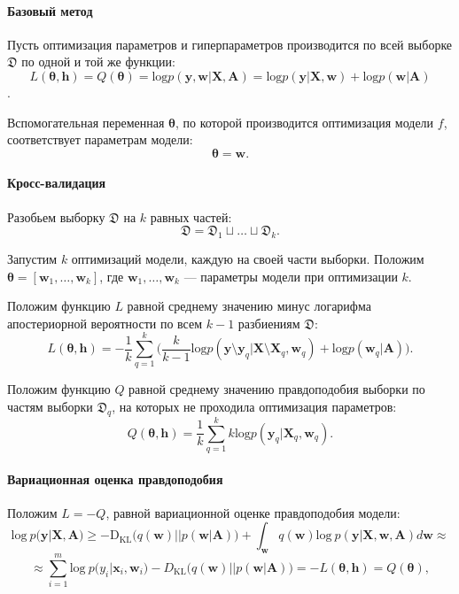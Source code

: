 \documentclass[12pt]{article}
\begin{document}
\paragraph{Базовый метод}
Пусть оптимизация параметров и гиперпараметров производится по всей выборке $\mathfrak{D}$ по одной и той же функции:
$$L(\boldsymbol{\theta}, \mathbf{h}) = Q(\boldsymbol{\theta}) = \text{log}p(\mathbf{y}, \mathbf{w} | \mathbf{X}, \mathbf{A}) = \text{log} p(\mathbf{y}|\mathbf{X}, \mathbf{w})+\text{log}p(\mathbf{w}|\mathbf{A})$$.

Вспомогательная переменная $\boldsymbol{\theta}$, по которой производится оптимизация модели $f$,  соответствует параметрам модели: 
\[
\boldsymbol{\theta} = \mathbf{w}.
\]

\paragraph{Кросс-валидация}
Разобьем выборку $\mathfrak{D}$ на $k$ равных частей:
\[
\mathfrak{D} = \mathfrak{D}_1 \sqcup \dots \sqcup \mathfrak{D}_k.
\]


Запустим $k$ оптимизаций модели, каждую на своей части выборки. Положим $\boldsymbol{\theta} = [\mathbf{w}_1, \dots, \mathbf{w}_k]$, где $\mathbf{w}_1, \dots, \mathbf{w}_k$ --- параметры модели при оптимизации $k$.
 
Положим функцию $L$ равной  среднему значению минус логарифма апостериорной вероятности по всем $k-1$ разбиениям $\mathfrak{D}$:
\begin{equation}
\label{eq:cv}
L(\boldsymbol{\theta}, \mathbf{h}) = -\frac{1}{k}\sum_{q=1}^k \bigl(\frac{k}{k-1}\text{log}p(\mathbf{y} \setminus \mathbf{y}_q|\mathbf{X}\setminus \mathbf{X}_q, \mathbf{w}_q) + \text{log}p(\mathbf{w}_q|\mathbf{A})\bigr).
\end{equation}

Положим функцию $Q$ равной среднему значению правдоподобия выборки по частям выборки $\mathfrak{D}_q$, на которых не проходила оптимизация параметров:
\[
Q(\boldsymbol{\theta}, \mathbf{h}) = \frac{1}{k}\sum_{q=1}^k k\text{log}p(\mathbf{y}_q|\mathbf{X}_q, \mathbf{w}_q).
\]

\paragraph{Вариационная оценка правдоподобия}
Положим $L=-Q$, равной вариационной оценке правдоподобия модели:
\begin{equation} 
\label{eq:elbo}
\text{log}~p(\mathbf{y}|\mathbf{X},\mathbf{A})  
\geq 
-\text{D}_\text{KL} \bigl(q(\mathbf{w})||p(\mathbf{w}|\mathbf{A})\bigr) + \int_{\mathbf{w}} q(\mathbf{w})\text{log}~{p(\mathbf{y}|\mathbf{X},\mathbf{w},\mathbf{A})} d \mathbf{w}  \approx
\end{equation}
\[
\approx \sum_{i=1}^m \text{log}~p({y}_i|\mathbf{x}_i, \mathbf{w}_i) - D_\text{KL}\bigl(q (\mathbf{w}) || p (\mathbf{w}|\mathbf{A})\bigr) = -L(\boldsymbol{\theta}, \mathbf{h}) = Q(\boldsymbol{\theta}),
\]
\end{document}
